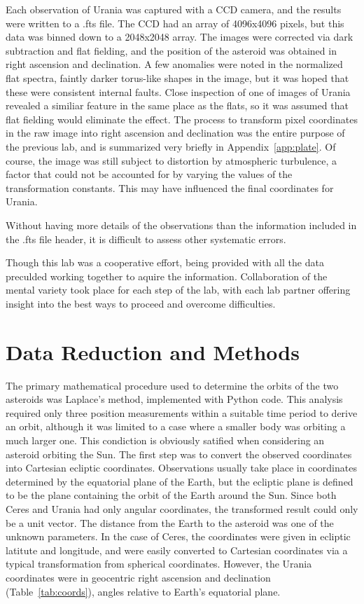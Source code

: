 \documentclass[a4paper,12pt]{article}
\begin{document}
Each observation of Urania was captured with a CCD camera, and the results were written to a .fts file. The CCD had an array of 4096x4096 pixels, but this data was binned down to a 2048x2048 array. The images were corrected via dark subtraction and flat fielding, and the position of the asteroid was obtained in right ascension and declination. A few anomalies were noted in the normalized flat spectra, faintly darker torus-like shapes in the image, but it was hoped that these were consistent internal faults. Close inspection of one of images of Urania revealed a similiar feature in the same place as the flats, so it was assumed that flat fielding would eliminate the effect.  The process to transform pixel coordinates in the raw image into right ascension and declination was the entire purpose of the previous lab, and is summarized very briefly in Appendix~\ref{app:plate}. Of course, the image was still subject to distortion by atmospheric turbulence, a factor that could not be accounted for by varying the values of the transformation constants. This may have influenced the final coordinates for Urania.

Without having more details of the observations than the information included in the .fts file header, it is difficult to assess other systematic errors.

Though this lab was a cooperative effort, being provided with all the data preculded working together to aquire the information. Collaboration of the mental variety took place for each step of the lab, with each lab partner offering insight into the best ways to proceed and overcome difficulties.



\section{Data Reduction and Methods}
\label{sec:data}

The primary mathematical procedure used to determine the orbits of the two asteroids was Laplace's method, implemented with Python code. This analysis required only three position measurements within a suitable time period to derive an orbit, although it was limited to a case where a smaller body was orbiting a much larger one. This condiction is obviously satified when considering an asteroid orbiting the Sun. The first step was to convert the observed coordinates into Cartesian ecliptic coordinates. Observations usually take place in coordinates determined by the equatorial plane of the Earth, but the ecliptic plane is defined to be the plane containing the orbit of the Earth around the Sun. Since both Ceres and Urania had only angular coordinates, the transformed result could only be a unit vector. The distance from the Earth to the asteroid was one of the unknown parameters. In the case of Ceres, the coordinates were given in ecliptic latitute and longitude, and were easily converted to Cartesian coordinates via a typical transformation from spherical coordinates. However, the Urania coordinates were in geocentric right ascension and declination (Table~\ref{tab:coords}), angles relative to Earth's equatorial plane.
\end{document}
